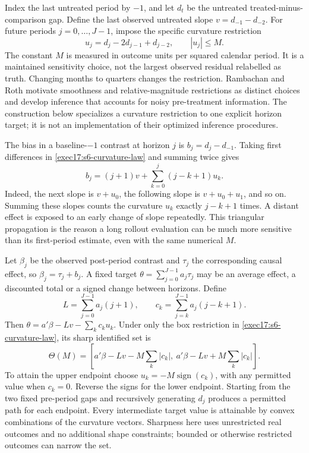 Index the last untreated period by $-1$, and let $d_t$ be the untreated
treated-minus-comparison gap. Define the last observed untreated slope
$v=d_{-1}-d_{-2}$. For future periods $j=0,\ldots,J-1$, impose the
specific curvature restriction
\begin{equation}
 u_j=d_j-2d_{j-1}+d_{j-2},\qquad |u_j|\leq M.
 \label{exec17:s6-curvature-law}
\end{equation}
The constant $M$ is measured in outcome units per squared calendar period.
It is a maintained sensitivity choice, not the largest observed residual
relabelled as truth. Changing months to quarters changes the restriction.
Rambachan and Roth motivate smoothness and relative-magnitude restrictions
as distinct choices and develop inference that accounts for noisy
pre-treatment information. The construction below specializes a curvature
restriction to one explicit horizon target; it is not an implementation of
their optimized inference procedures.~\citep{rambachan2023}

The bias in a baseline-$-1$ contrast at horizon $j$ is
$b_j=d_j-d_{-1}$. Taking first differences in
\eqref{exec17:s6-curvature-law} and summing twice gives
\begin{equation}
 b_j=(j+1)v+\sum_{k=0}^{j}(j-k+1)u_k.
 \label{exec17:s6-triangular}
\end{equation}
Indeed, the next slope is $v+u_0$, the following slope is
$v+u_0+u_1$, and so on. Summing these slopes counts the curvature
$u_k$ exactly $j-k+1$ times. A distant effect is exposed to an early
change of slope repeatedly. This triangular propagation is the reason a
long rollout evaluation can be much more sensitive than its first-period
estimate, even with the same numerical $M$.

Let $\beta_j$ be the observed post-period contrast and $\tau_j$ the
corresponding causal effect, so $\beta_j=\tau_j+b_j$. A fixed target
$\theta=\sum_{j=0}^{J-1}a_j\tau_j$ may be an average effect, a discounted
total or a signed change between horizons. Define
\begin{equation}
 L=\sum_{j=0}^{J-1}a_j(j+1),\qquad
 c_k=\sum_{j=k}^{J-1}a_j(j-k+1).
 \label{exec17:s6-target-kernel}
\end{equation}
Then $\theta=a'\beta-Lv-\sum_k c_ku_k$. Under only the box
restriction in \eqref{exec17:s6-curvature-law}, its sharp identified set is
\begin{equation}
 \Theta(M)=
 \left[a'\beta-Lv-M\sum_k|c_k|,
       \ a'\beta-Lv+M\sum_k|c_k|\right].
 \label{exec17:s6-sharp-curvature}
\end{equation}
To attain the upper endpoint choose
$u_k=-M\operatorname{sign}(c_k)$, with any permitted value when
$c_k=0$. Reverse the signs for the lower endpoint. Starting from the
two fixed pre-period gaps and recursively generating $d_j$ produces a
permitted path for each endpoint. Every intermediate target value is
attainable by convex combinations of the curvature vectors. Sharpness here
uses unrestricted real outcomes and no additional shape constraints; bounded
or otherwise restricted outcomes can narrow the set.


